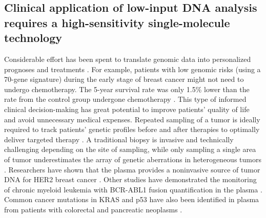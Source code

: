 \subsection{Clinical application of low-input DNA analysis requires a high-sensitivity single-molecule technology}
Considerable effort has been spent to translate genomic data into personalized prognoses and treatments \cite{Cardoso:2016dt,Papaemmanuil:2016jz,Girirajan:2012ks}. For example, patients with low genomic risks (using a 70-gene signature) during the early stage of breast cancer might not need to undergo chemotherapy. The 5-year survival rate was only 1.5\% lower than the rate from the control group undergone chemotherapy \cite{Cardoso:2016dt}. This type of informed clinical decision-making has great potential to improve patients' quality of life and avoid unnecessary medical expenses. Repeated sampling of a tumor is ideally required to track patients' genetic profiles before and after therapies to optimally deliver targeted therapy \cite{Gevensleben:2013kg}. A traditional biopsy is invasive and technically challenging depending on the site of sampling, while only sampling a single area of tumor underestimates the array of genetic aberrations in heterogeneous tumors \cite{Ding:2010hu}. Researchers have shown that the plasma provides a noninvasive source of tumor DNA for HER2 breast cancer \cite{Gevensleben:2013kg,Cochran:2014cn}. Other studies have demonstrated the monitoring of chronic myeloid leukemia with BCR-ABL1 fusion quantification in the plasma \cite{Jennings:2014et}. Common cancer mutations in KRAS and p53 have also been identified in plasma from patients with colorectal and pancreatic neoplasms \cite{Anker:1997ub,Mulcahy:1998wa}. 

